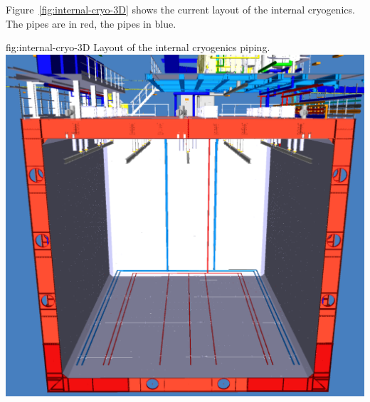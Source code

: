 Figure~\ref{fig:internal-cryo-3D} shows the current layout of the internal cryogenics. 
The  pipes are in red, the  pipes in blue.

\begin{dunefigure}{fig:internal-cryo-3D}
  {Layout of the internal cryogenics piping.}
\includegraphics[width=.98\textwidth]{graphics/Internal-Piping-3D.pdf}
\end{dunefigure}

